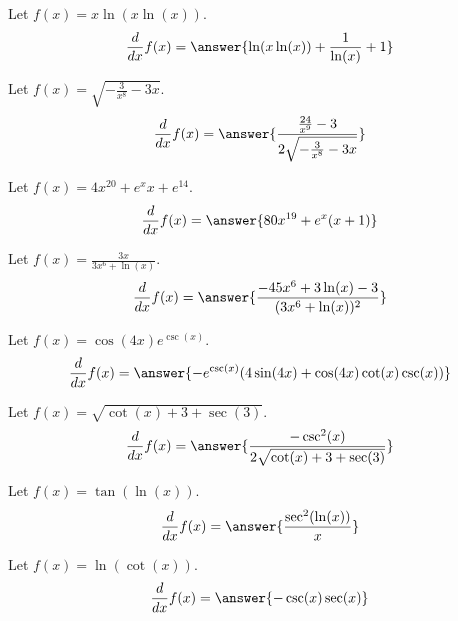 \documentclass{ximera}
\begin{document}
\begin{shuffle}
\begin{exercise}
Let $f(x)=x \ln (x \ln (x))$.
\[
\ddx f(x) = \answer{\ln (x \ln (x))+\frac{1}{\ln (x)}+1}
\]
\end{exercise}

\begin{exercise}
Let $f(x)=\sqrt{-\frac{3}{x^8}-3 x}$.
\[
\ddx f(x) = \answer{\frac{\frac{24}{x^9}-3}{2 \sqrt{-\frac{3}{x^8}-3 x}}}
\]
\end{exercise}

\begin{exercise}
Let $f(x)=4 x^{20}+e^x x+e^{14}$.
\[
\ddx f(x) = \answer{80 x^{19}+e^x (x+1)}
\]
\end{exercise}



\begin{exercise}
Let $f(x)=\frac{3 x}{3 x^6+\ln (x)}$.
\[
\ddx f(x) = \answer{\frac{-45 x^6+3 \ln (x)-3}{(3 x^6+\ln (x))^2}}
\]
\end{exercise}

\begin{exercise}
Let $f(x)=\cos (4 x) e^{\csc (x)}$.
\[
\ddx f(x) = \answer{-e^{\csc (x)} (4 \sin (4 x)+\cos (4 x) \cot (x) \csc (x))}
\]
\end{exercise}

\begin{exercise}
Let $f(x)=\sqrt{\cot (x)+3+\sec (3)}$.
\[
\ddx f(x) = \answer{\frac{-\csc ^2(x)}{2 \sqrt{\cot (x)+3+\sec (3)}}}
\]
\end{exercise}

\begin{exercise}
Let $f(x)=\tan (\ln (x))$.
\[
\ddx f(x) = \answer{\frac{\sec ^2(\ln (x))}{x}}
\]
\end{exercise}

\begin{exercise}
Let $f(x)=\ln (\cot (x))$.
\[
\ddx f(x) = \answer{-\csc (x) \sec (x)}
\]
\end{exercise}


\end{shuffle}
\end{document}
